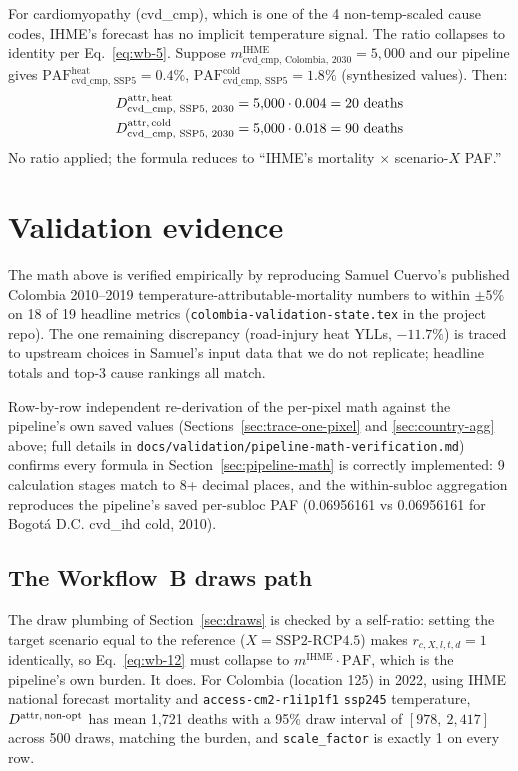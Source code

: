 \documentclass[11pt]{article}
\newcommand{\PAF}{\text{PAF}}
\newcommand{\SSPtwo}{\text{SSP2{-}RCP4.5}}
\newcommand{\mIHME}{m^{\text{IHME}}}
\begin{document}
For cardiomyopathy (cvd\_cmp), which is one of the 4 non-temp-scaled
cause codes, IHME's forecast has no implicit temperature signal. The ratio
collapses to identity per Eq.~\eqref{eq:wb-5}. Suppose
$\mIHME_{\text{cvd\_cmp, Colombia, 2030}} = 5{,}000$ and our pipeline
gives $\PAF^{\text{heat}}_{\text{cvd\_cmp, SSP5}} = 0.4\%$,
$\PAF^{\text{cold}}_{\text{cvd\_cmp, SSP5}} = 1.8\%$ (synthesized
values). Then:
\begin{align*}
\mAttr[heat]_{\text{cvd\_cmp, SSP5, 2030}}
&= 5{,}000 \cdot 0.004 = 20 \text{ deaths} \\
\mAttr[cold]_{\text{cvd\_cmp, SSP5, 2030}}
&= 5{,}000 \cdot 0.018 = 90 \text{ deaths}
\end{align*}
No ratio applied; the formula reduces to ``IHME's mortality $\times$
scenario-$X$ PAF.''

\section{Validation evidence}
\label{sec:validation}

The math above is verified empirically by reproducing Samuel Cuervo's
published Colombia 2010--2019 temperature-attributable-mortality numbers
to within $\pm 5\%$ on 18 of 19 headline metrics (\texttt{colombia-validation-state.tex} in the project repo). The one remaining discrepancy
(road-injury heat YLLs, $-11.7\%$) is traced to upstream choices in
Samuel's input data that we do not replicate; headline totals and top-3
cause rankings all match.

Row-by-row independent re-derivation of the per-pixel math against the
pipeline's own saved values (Sections~\ref{sec:trace-one-pixel} and
\ref{sec:country-agg} above; full details in
\texttt{docs/validation/pipeline-math-verification.md}) confirms every formula in
Section~\ref{sec:pipeline-math} is correctly implemented: 9 calculation
stages match to 8+ decimal places, and the within-subloc aggregation
reproduces the pipeline's saved per-subloc PAF (0.06956161 vs 0.06956161
for Bogotá D.C. cvd\_ihd cold, 2010).

\subsection*{The Workflow~B draws path}

The draw plumbing of Section~\ref{sec:draws} is checked by a self-ratio:
setting the target scenario equal to the reference ($X = \SSPtwo$) makes
$r_{c,X,l,t,d} = 1$ identically, so Eq.~\eqref{eq:wb-12} must collapse to
$\mIHME \cdot \PAF$, which is the pipeline's own burden. It does. For
Colombia (location 125) in 2022, using IHME national forecast mortality
and \texttt{access-cm2-r1i1p1f1} \texttt{ssp245} temperature,
$\mAttr[non-opt]$ has mean 1{,}721 deaths with a 95\% draw
interval of $[978,\ 2{,}417]$ across 500 draws, matching the burden, and
\texttt{scale\_factor} is exactly 1 on every row.
\end{document}
